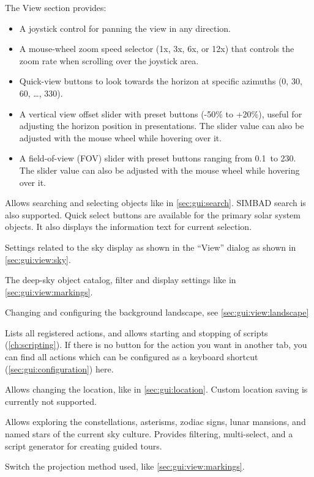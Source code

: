 \begin{description}
The View section provides:
\begin{itemize}
\item A joystick control for panning the view in any direction.
\item A mouse-wheel zoom speed selector (1x, 3x, 6x, or 12x) that controls
  the zoom rate when scrolling over the joystick area.
\item Quick-view buttons to look towards the horizon at specific azimuths
  (0\degree, 30\degree, 60\degree, \ldots, 330\degree).
\item A vertical view offset slider with preset buttons (-50\% to +20\%),
  useful for adjusting the horizon position in presentations. The slider
  value can also be adjusted with the mouse wheel while hovering over it.
\item A field-of-view (FOV) slider with preset buttons ranging from
  0.1\degree\ to 230\degree. The slider value can also be adjusted with the
  mouse wheel while hovering over it.
\end{itemize}
\item[Selection] Allows searching and selecting objects like in \autoref{sec:gui:search}. 
SIMBAD search is also supported. Quick select buttons are available for the 
primary solar system objects. It also displays the information text for current 
selection.
\item[Sky] Settings related to the sky display as shown in the ``View'' dialog 
as shown in \autoref{sec:gui:view:sky}.
\item[DSO] The deep-sky object catalog, filter and display settings like in 
\autoref{sec:gui:view:markings}.
\item[Landscape] Changing and configuring the background landscape, see 
\autoref{sec:gui:view:landscape}
\item[Actions and scripts] Lists all registered actions, and allows starting 
and stopping of scripts (\autoref{ch:scripting}). If there is no button for the 
action you want in another tab, you can find all actions which can be 
configured as a keyboard shortcut (\autoref{sec:gui:configuration}) here.
\item[Location] Allows changing the location, like in 
\autoref{sec:gui:location}. Custom location saving is currently not 
supported.
\item[Sky Culture] Allows exploring the constellations, asterisms, zodiac signs, lunar mansions, 
and named stars of the current sky culture. 
Provides filtering, multi-select, and a script generator for creating guided tours.
\item[Projection] Switch the projection method used, like \autoref{sec:gui:view:markings}.
\end{description}

